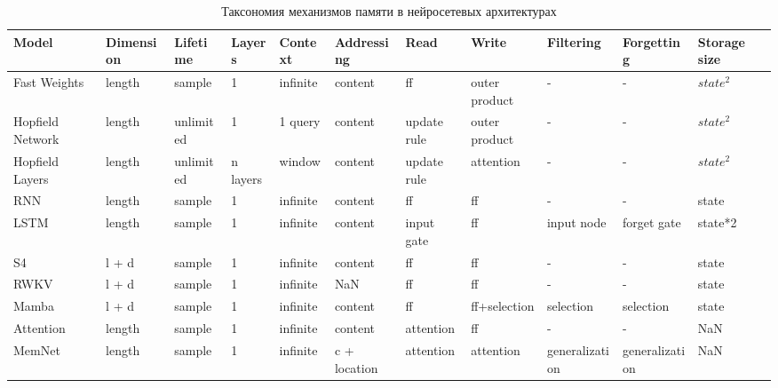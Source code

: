 \begin{table}[ht]
\centering
\tiny
\caption{Таксономия механизмов памяти в нейросетевых архитектурах}
\label{tab:taxonomy}
\begin{tabular}{lllllllllll}
\toprule
           Model & Dimension &  Lifetime &   Layers &      Context &   Addressing &             Read &                  Write &         Filtering &     Forgetting &             Storage size \\
\midrule
    Fast Weights &    length &    sample &        1 &     infinite &      content &               ff &          outer product &                 - &              - &                $state^2$ \\
Hopfield Network &    length & unlimited &        1 &      1 query &      content &      update rule &          outer product &                 - &              - &                $state^2$ \\
 Hopfield Layers &    length & unlimited & n layers &       window &      content &      update rule &              attention &                 - &              - &                $state^2$ \\
             RNN &    length &    sample &        1 &     infinite &      content &               ff &                     ff &                 - &              - &                    state \\
            LSTM &    length &    sample &        1 &     infinite &      content &       input gate &                     ff &        input node &    forget gate &                  state*2 \\
              S4 &     l + d &    sample &        1 &     infinite &      content &               ff &                     ff &                 - &              - &                    state \\
            RWKV &     l + d &    sample &        1 &     infinite &          NaN &               ff &                     ff &                 - &              - &                    state \\
           Mamba &     l + d &    sample &        1 &     infinite &      content &               ff &           ff+selection &         selection &      selection &                    state \\
       Attention &    length &    sample &        1 &     infinite &      content &        attention &                     ff &                 - &              - &                      NaN \\
          MemNet &    length &    sample &        1 &     infinite & c + location &        attention &              attention &    generalization & generalization &                      NaN \\

\end{tabular}
\end{table}
